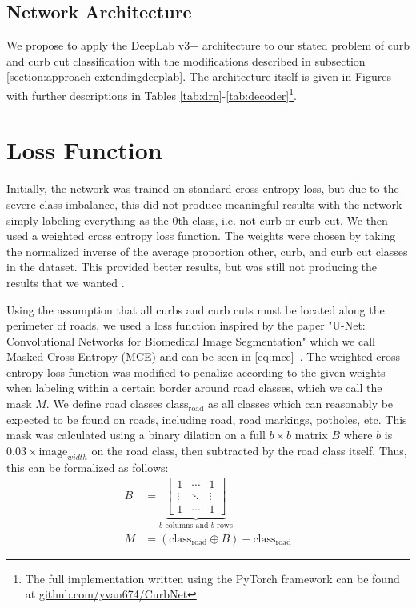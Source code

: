 \subsection{Network Architecture}\label{section:approach-networkarchitecture}
We propose to apply the DeepLab v3+ architecture to our stated problem of curb and curb cut classification with the modifications described in subsection \ref{section:approach-extendingdeeplab}.
The architecture itself is given in Figures  with further descriptions in Tables \ref{tab:drn}-\ref{tab:decoder}\footnote{The full implementation written using the PyTorch framework can be found at \url{github.com/yvan674/CurbNet}}.






\section{Loss Function}\label{section:approach-lossfunction}
Initially, the network was trained on standard cross entropy loss, but due to the severe class imbalance, this did not produce meaningful results with the network simply labeling everything as the 0th class, i.e. not curb or curb cut.
We then used a weighted cross entropy loss function.
The weights were chosen by taking the normalized inverse of the average proportion other, curb, and curb cut classes in the dataset.
This provided better results, but was still not producing the results that we wanted .

Using the assumption that all curbs and curb cuts must be located along the perimeter of roads, we used a loss function inspired by the paper "U-Net: Convolutional Networks for Biomedical Image Segmentation" which we call Masked Cross Entropy (MCE) and can be seen in \eqref{eq:mce}~\cite{unet}.
The weighted cross entropy loss function was modified to penalize according to the given weights when labeling within a certain border around road classes, which we call the mask $M$.
We define road classes $\text{class}_{\text{road}}$ as all classes which can reasonably be expected to be found on roads, including road, road markings, potholes, etc.
This mask was calculated using a binary dilation on a full $b \times b$ matrix $B$ where $b$ is $0.03 \times \text{image}_{width}$ on the road class, then subtracted by the road class itself.
Thus, this can be formalized as follows:
\begin{align}
	B &= \underbrace{
			\begin{bmatrix}
				1  & \cdots & 1\\ 
				\vdots &  \ddots & \vdots\\ 
				1 &  \cdots & 1
				\end{bmatrix}}_{b \text{ columns and } b \text{ rows}} \\
	M &= \left(\text{class}_{\text{road}} \oplus B\right) - \text{class}_{\text{road}}
\end{align}

